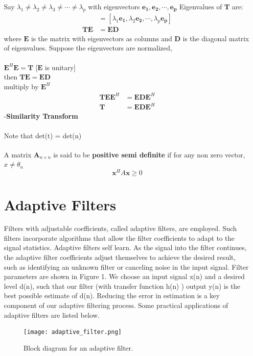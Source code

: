 \begin{enumerate}
Say $\lambda_1\neq\lambda_2\neq\lambda_3\neq\cdots\neq\lambda_p$ with eigenvectors $\mathbf{e_1},\mathbf{e_2},\cdots,\mathbf{e_p}$
Eigenvalues of $\mathbf{T}$ are:
\begin{align*}
[\mathbf{e_1},\mathbf{e_2},\cdots,\mathbf{e_p}] &= [\lambda_1\mathbf{e_1},\lambda_2\mathbf{e_2},\cdots,\lambda_p\mathbf{e_p}] \\
\mathbf{T}\mathbf{E}&=\mathbf{E}\mathbf{D}
\end{align*}
where $\mathbf{E}$ is the matrix with eigenvectors as columns and $\mathbf{D}$ is the diagonal matrix of eigenvalues.
Suppose the eigenvectors are normalized,\\\\
\indent$\mathbf{E}^H\mathbf{E} =\mathbf{T}$ [$\mathbf{E}$ is unitary]\\
then $\mathbf{T}\mathbf{E} = \mathbf{E}\mathbf{D}$\\ multiply by $\mathbf{E}^H$ \\
\begin{align*}
\mathbf{T}\mathbf{E}\mathbf{E}^H &= \mathbf{E}\mathbf{D}\mathbf{E}^H \\
\mathbf{T}&=\mathbf{E}\mathbf{D}\mathbf{E}^H
\end{align*}
-\textbf{Similarity Transform}
\\\\Note that det(t) = det(n)
\\\\A matrix $\mathbf{A}_{n\times n}$ is said to be \textbf{positive semi definite} if for any non zero vector, $x\neq\theta_n$
$$\mathbf{x}^HA\mathbf{x}\geq 0$$


\end{enumerate}

\section{Adaptive Filters}

Filters with adjustable coefficients, called adaptive filters, are employed. Such filters incorporate algorithms that allow the filter coefficients to adapt to the signal statistics. Adaptive filters self learn. As the signal into the filter continues, the adaptive filter coefficients adjust themselves to achieve the desired result, such as identifying an unknown filter or canceling noise in the input signal. Filter parameters are shown in Figure 1. We choose an input signal x(n) and a desired level d(n), such that our filter (with transfer function h(n) ) output y(n) is the best possible estimate of d(n). Reducing the error in estimation is a key component of our adaptive filtering process.
Some practical applications of adaptive filters are listed below.
\begin{figure}[!ht]
\centering
\texttt{[image: adaptive\_filter.png]}
\caption{\label{fig:adaptive_filter}Block diagram for an adaptive filter.}
\end{figure}

